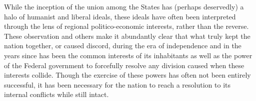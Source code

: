 \documentclass[a4paper]{article}
\begin{document}
While the inception of the union among the States has (perhaps deservedly) a halo of humanist and liberal ideals, these ideals have often been interpreted through the lens of regional politico-economic interests, rather than the reverse. These observation and others make it abundantly clear that what truly kept the nation together, or caused discord, during the era of independence and in the years since has been the common interests of its inhabitants as well as the power of the Federal government to forcefully resolve any division caused when these interests collide. Though the exercise of these powers has often not been entirely successful, it has been necessary for the nation to reach a resolution to its internal conflicts while still intact.  


\printbibliography
 

 
\end{document}
